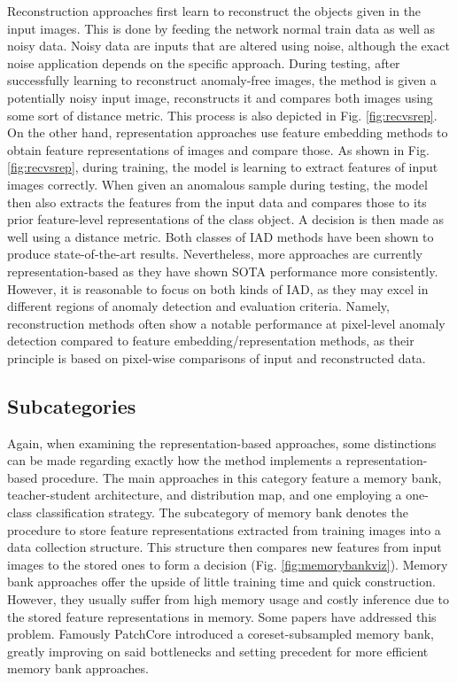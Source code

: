 Reconstruction approaches first learn to reconstruct the objects given in the input images. This is done by feeding the network normal train data as well as noisy data. Noisy data are inputs
that are altered using noise, although the exact noise application depends on the specific approach. During testing, after successfully learning to 
reconstruct anomaly-free images, the method is given a potentially noisy input image, reconstructs it and compares both images using some sort of distance metric. This process is also depicted in Fig. \ref{fig:recvsrep}. 
On the other hand, representation approaches use feature embedding methods to obtain feature representations of images and compare those. As shown in Fig. \ref{fig:recvsrep}, during training, the model is 
learning to extract features of input images correctly. When given an anomalous sample during testing, the model then also extracts the features from the input data and compares those to its 
prior feature-level representations of the class object. A decision is then made as well using a distance metric.\newline
Both classes of IAD methods have been shown to produce state-of-the-art results. Nevertheless, more approaches are currently representation-based \cite{liu2024deep} as they have shown SOTA performance more 
consistently. However, it is reasonable to focus on both kinds of IAD, as they may excel in different regions of anomaly detection and evaluation criteria. Namely, reconstruction methods often show a notable performance at pixel-level anomaly detection compared to feature embedding/representation methods, as their principle is based on pixel-wise comparisons of input 
and reconstructed data.



\subsection{Subcategories}

Again, when examining the representation-based approaches, some distinctions can be made regarding exactly how the method implements a representation-based procedure.
The main approaches in this category feature a memory bank, teacher-student architecture, and distribution map, and one employing a one-class classification strategy. The subcategory of 
memory bank denotes the procedure to store feature representations extracted from training images into a data collection structure. This structure then compares new 
features from input images to the stored ones to form a decision (Fig. \ref{fig:memorybankviz}). Memory bank approaches offer the upside of little training time and quick construction. However, they usually suffer from high memory 
usage and costly inference due to the stored feature representations in memory. Some papers have addressed this problem. Famously PatchCore \cite{patchCore2022} introduced a coreset-subsampled 
memory bank, greatly improving on said bottlenecks and setting precedent for more efficient memory bank approaches. \newline

